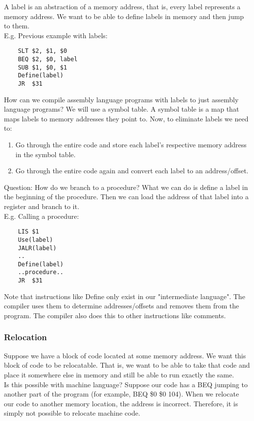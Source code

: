 \documentclass[12pt, letterpaper]{article}
\begin{document}
A label is an abstraction of a memory address, that is, every label represents a memory address. We want to be able to define labels in memory and then jump to them.\\

E.g. Previous example with labels:
\begin{verbatim}
	SLT $2, $1, $0
	BEQ $2, $0, label
	SUB $1, $0, $1
	Define(label)
	JR  $31
\end{verbatim}

How can we compile assembly language programs with labels to just assembly language programs? We will use a symbol table. A symbol table is a map that maps labels to memory addresses they point to. Now, to eliminate labels we need to:

\begin{enumerate}
\item Go through the entire code and store each label's respective memory address in the symbol table.
\item Go through the entire code again and convert each label to an address/offset.
\end{enumerate}

Question: How do we branch to a procedure? What we can do is define a label in the beginning of the procedure. Then we can load the address of that label into a register and branch to it.\\

E.g. Calling a procedure:
\begin{verbatim}
	LIS $1
	Use(label)
	JALR(label)
	..
	Define(label)
	..procedure..
	JR  $31
\end{verbatim}

Note that instructions like Define only exist in our "intermediate language". The compiler uses them to determine addresses/offsets and removes them from the program. The compiler also does this to other instructions like comments.

\subsubsection{Relocation}
Suppose we have a block of code located at some memory address. We want this block of code to be relocatable. That is, we want to be able to take that code and place it somewhere else in memory and still be able to run exactly the same.\\

Is this possible with machine language? Suppose our code has a BEQ jumping to another part of the program (for example, BEQ \$0 \$0 104). When we relocate our code to another memory location, the address is incorrect. Therefore, it is simply not possible to relocate machine code.\\
\end{document}
